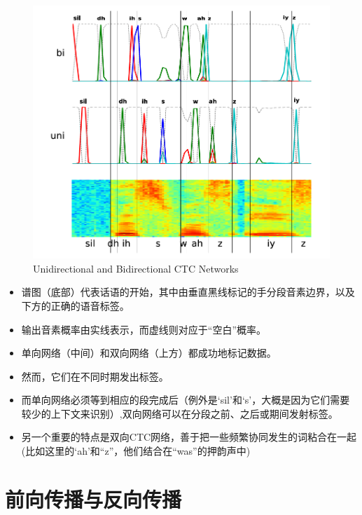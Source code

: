 \documentclass[]{book}
\theoremstyle{definition}
\theoremstyle{definition}
\theoremstyle{definition}
\theoremstyle{remark}
\begin{document}
\begin{figure}

{\centering \includegraphics[width=1\linewidth]{pic/fig2} 

}

\caption{Unidirectional and Bidirectional CTC Networks}\label{fig:unnamed-chunk-2}
\end{figure}

\begin{itemize}
\item
  谱图（底部）代表话语的开始，其中由垂直黑线标记的手分段音素边界，以及下方的正确的语音标签。
\item
  输出音素概率由实线表示，而虚线则对应于``空白''概率。
\item
  单向网络（中间）和双向网络（上方）都成功地标记数据。
\item
  然而，它们在不同时期发出标签。
\item
  而单向网络必须等到相应的段完成后（例外是`sil'和`s'，大概是因为它们需要较少的上下文来识别）,双向网络可以在分段之前、之后或期间发射标签。
\item
  另一个重要的特点是双向CTC网络，善于把一些频繁协同发生的词粘合在一起(比如这里的`ah'和``z''，他们结合在``was''的押韵声中)
\end{itemize}

\chapter{前向传播与反向传播}\label{Forward-Backward-Algorithm}
\end{document}
